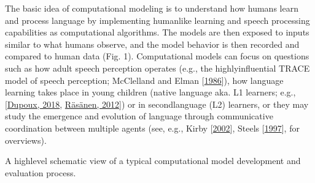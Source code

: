 \documentclass[letterpaper,10pt,english]{jupyterBook}
\begin{document}
\sphinxAtStartPar
The basic idea of computational modeling is to understand how humans
learn and process language by implementing human\sphinxhyphen{}like learning and
speech processing capabilities as computational algorithms. The models
are then exposed to inputs similar to what humans observe, and the model
behavior is then recorded and compared to human data (Fig. 1).
Computational models can focus on questions such as how adult speech
perception operates (e.g., the highly\sphinxhyphen{}influential TRACE model of speech
perception; McClelland and Elman {[}\hyperlink{cite.References:id26}{1986}{]}), how language learning takes place
in young children (native language aka. L1 learners; e.g., {[}\hyperlink{cite.References:id34}{Dupoux, 2018}, \hyperlink{cite.References:id20}{Räsänen, 2012}{]}) or in second\sphinxhyphen{}language (L2) learners, or they may
study the emergence and evolution of language through communicative
coordination between multiple agents (see, e.g.,  Kirby {[}\hyperlink{cite.References:id29}{2002}{]}, Steels {[}\hyperlink{cite.References:id14}{1997}{]}, for overviews).

\sphinxAtStartPar
{}
 A high\sphinxhyphen{}level schematic view of a typical computational model development and evaluation process.
\end{document}
